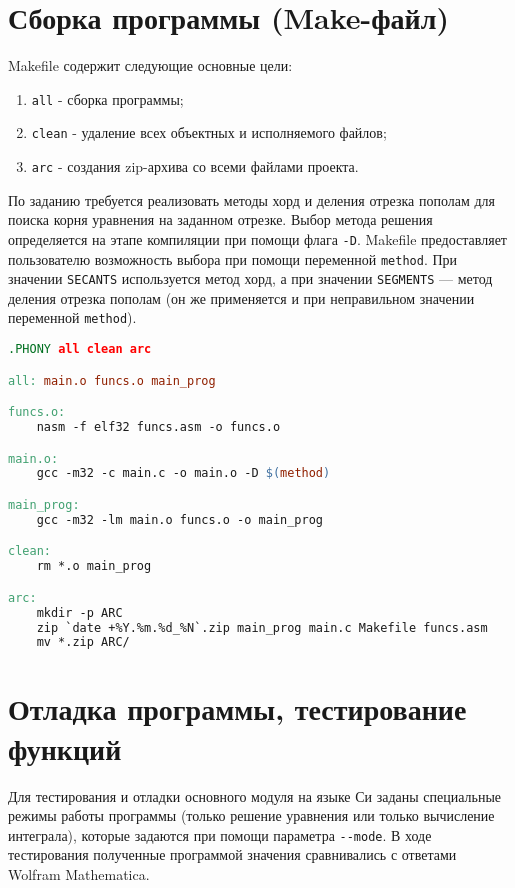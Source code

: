 \documentclass[a4paper,12pt,titlepage,finall]{article}
\begin{document}
\newpage

\section{Сборка программы (Make-файл)}

Makefile содержит следующие основные цели:
\begin{enumerate}
\item \texttt{all} - сборка программы;
\item \texttt{clean} - удаление всех объектных и исполняемого файлов;
\item \texttt{arc} - создания zip-архива со всеми файлами проекта.
\end{enumerate}

По заданию требуется реализовать методы хорд и деления отрезка пополам для поиска корня уравнения на заданном отрезке. Выбор метода решения определяется на этапе компиляции при помощи флага \texttt{-D}. Makefile предоставляет пользователю возможность выбора при помощи переменной \texttt{method}. При значении \texttt{SECANTS} используется метод хорд, а при значении \texttt{SEGMENTS} --- метод деления отрезка пополам (он же применяется и при неправильном значении переменной \texttt{method}).\\

\begin{lstlisting}[language=make, caption={Текст Makefile}, captionpos=b]
.PHONY all clean arc

all: main.o funcs.o main_prog

funcs.o:
    nasm -f elf32 funcs.asm -o funcs.o

main.o:
    gcc -m32 -c main.c -o main.o -D $(method)

main_prog:
    gcc -m32 -lm main.o funcs.o -o main_prog

clean:
    rm *.o main_prog

arc:
    mkdir -p ARC
    zip `date +%Y.%m.%d_%N`.zip main_prog main.c Makefile funcs.asm
    mv *.zip ARC/
\end{lstlisting}

\newpage

\section{Отладка программы, тестирование функций}

Для тестирования и отладки основного модуля на языке Си заданы специальные режимы работы программы (только решение уравнения или только вычисление интеграла), которые задаются при помощи параметра \texttt{-{}-mode}. В ходе тестирования полученные программой значения сравнивались с ответами Wolfram Mathematica.\\
\end{document}

